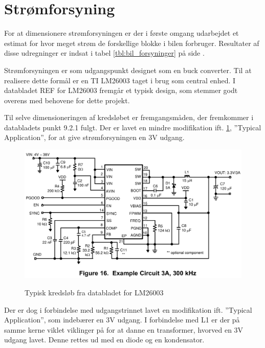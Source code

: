 \section{Strømforsyning}

For at dimensionere strømforsyningen er der i første omgang udarbejdet et estimat for hvor meget strøm de forskellige blokke i bilen forbruger. 
Resultater af disse udregninger er indsat i tabel \ref{tbl:bil_forsyninger} på side \pageref{tbl:bil_forsyninger}.

Strømforsyningen er som udgangspunkt designet som en buck converter.%
Til at realisere dette formål er en TI LM26003 taget i brug som central enhed.
I databladet REF for LM26003 fremgår et typisk design, som stemmer godt overens med behovene for dette projekt.

Til selve dimensioneringen af kredsløbet er fremgangsmåden, der fremkommer i databladets punkt 9.2.1 fulgt. Der er lavet en mindre modifikation ift. \ref{fig:lm26003fig16}, ''Typical Application'', for at give strømforsyningen en 3V udgang.

\begin{figure}[h]
\centering
\includegraphics[width=\textwidth* 9/10]{../fig/billeder/lm26003fig16}
\label{fig:lm26003fig16}
\caption{Typisk kredsløb fra databladet for LM26003}
\end{figure}

Der er dog i forbindelse med udgangstrinnet lavet en modifikation ift. ''Typical Application'', som indebærer en 3V udgang. I forbindelse med L1 er der på samme kerne viklet viklinger på for at danne en transformer, hvorved en 3V udgang lavet. Denne rettes ud med en diode og en kondensator. 